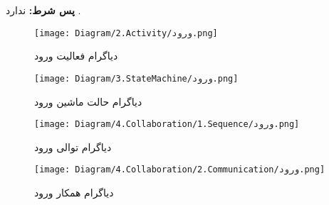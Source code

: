 \noindent
\textbf{پس شرط:}
ندارد .

\begin{figure}[H]
	\centering
	\texttt{[image: Diagram/2.Activity/ورود.png]}
	\caption{دیاگرام فعالیت ورود}
	\label{fig:a:ورود}
\end{figure}
\begin{figure}[H]
\centering
\texttt{[image: Diagram/3.StateMachine/ورود.png]}
\caption{دیاگرام حالت ماشین ورود}
\label{fig:sm:ورود}
\end{figure}
\begin{figure}[H]
	\centering
	\texttt{[image: Diagram/4.Collaboration/1.Sequence/ورود.png]}
	\caption{دیاگرام توالی ورود}
	\label{fig:s:ورود}
\end{figure}
\begin{figure}[H]
\centering
\texttt{[image: Diagram/4.Collaboration/2.Communication/ورود.png]}
\caption{دیاگرام همکار ورود}
\label{fig:c:ورود}
\end{figure}
